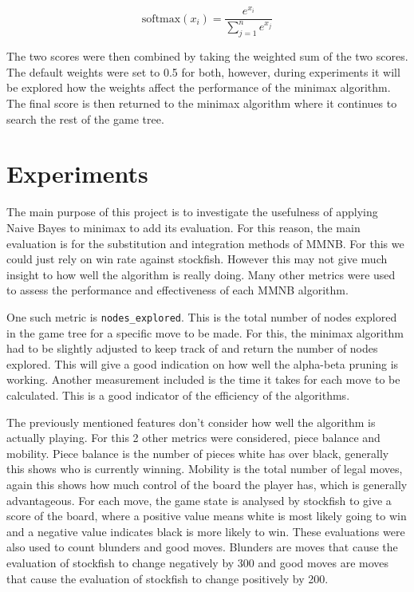 \begin{equation}
    \label{eq:softmax}
    \text{softmax}(x_i) = \frac{e^{x_i}}{\sum_{j=1}^{n} e^{x_j}}
\end{equation}


The two scores were then combined by taking the weighted sum of the two scores. The default weights were set to 0.5 for both, however, during experiments it will be explored how the weights affect the performance of the minimax algorithm. The final score is then returned to the minimax algorithm where it continues to search the rest of the game tree.


\section{Experiments}

The main purpose of this project is to investigate the usefulness of applying Naive Bayes to minimax to add its evaluation. For this reason, the main evaluation is for the substitution and integration methods of MMNB. For this we could just rely on win rate against stockfish. However this may not give much insight to how well the algorithm is really doing. Many other metrics were used to assess the performance and effectiveness of each MMNB algorithm. 

One such metric is \texttt{nodes\_explored}. This is the total number of nodes explored in the game tree for a specific move to be made. For this, the minimax algorithm had to be slightly adjusted to keep track of and return the number of nodes explored. This will give a good indication on how well the alpha-beta pruning is working. Another measurement included is the time it takes for each move to be calculated. This is a good indicator of the efficiency of the algorithms. 

The previously mentioned features don't consider how well the algorithm is actually playing. For this 2 other metrics were considered, piece balance and mobility. Piece balance is the number of pieces white has over black, generally this shows who is currently winning. Mobility is the total number of legal moves, again this shows how much control of the board the player has, which is generally advantageous. For each move, the game state is analysed by stockfish to give a score of the board, where a positive value means white is most likely going to win and a negative value indicates black is more likely to win. These evaluations were also used to count blunders and good moves. Blunders are moves that cause the evaluation of stockfish to change negatively by 300 and good moves are moves that cause the evaluation of stockfish to change positively by 200.  

